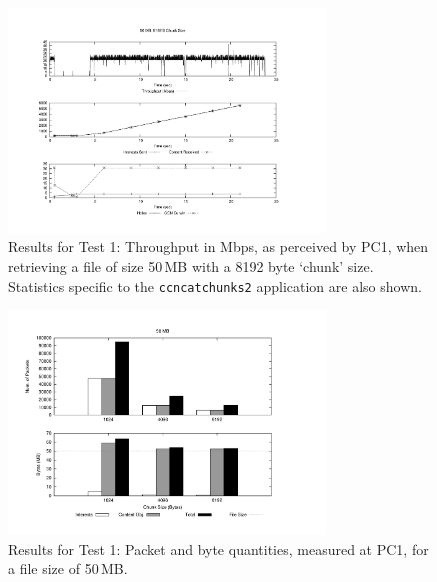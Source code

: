 \begin{figure}[H]

    \centering
    \includegraphics[width=0.75\textwidth]{figures/udp_50_8192.pdf}
    \cprotect\caption{Results for Test 1: Throughput in Mbps, as perceived by 
        PC1, when retrieving a file of size 50\,MB with a 8192 byte 
        `chunk' size. Statistics specific to the \verb+ccncatchunks2+ application 
        are also shown.}
    \label{fig:test-1-thpt-50-8192}

\end{figure}

\begin{figure}[H]

    \centering
    \includegraphics[width=0.75\textwidth]{figures/udp_50.pdf}
    \cprotect\caption{Results for Test 1: Packet and byte quantities, measured 
        at PC1, for a file size of 50\,MB.}
    \label{fig:test-1-packets-bytes-50}

\end{figure}

